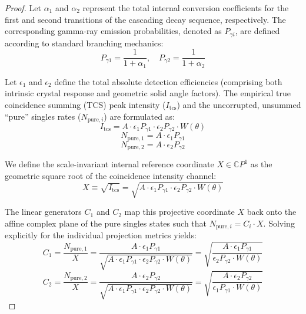 \documentclass[review]{elsarticle} %
\begin{document}
\begin{proof}
Let $\alpha_1$ and $\alpha_2$ represent the total internal conversion coefficients for the first and second transitions of the cascading decay sequence, respectively. The corresponding gamma-ray emission probabilities, denoted as $P_{\gamma i}$, are defined according to standard branching mechanics:
\begin{equation}
    P_{\gamma 1} = \frac{1}{1+\alpha_1}, \quad P_{\gamma 2} = \frac{1}{1+\alpha_2}
\end{equation}

Let $\epsilon_1$ and $\epsilon_2$ define the total absolute detection efficiencies (comprising both intrinsic crystal response and geometric solid angle factors). The empirical true coincidence summing (TCS) peak intensity ($I_{\text{tcs}}$) and the uncorrupted, unsummed ``pure'' singles rates ($N_{\text{pure}, i}$) are formulated as:
\begin{equation}
    I_{\text{tcs}} = A \cdot \epsilon_1 P_{\gamma 1} \cdot \epsilon_2 P_{\gamma 2} \cdot W(\theta)
\end{equation}
\begin{equation}
    N_{\text{pure}, 1} = A \cdot \epsilon_1 P_{\gamma 1}
\end{equation}
\begin{equation}
    N_{\text{pure}, 2} = A \cdot \epsilon_2 P_{\gamma 2}
\end{equation}

We define the scale-invariant internal reference coordinate $X \in \mathbb{C}P^1$ as the geometric square root of the coincidence intensity channel:
\begin{equation}
    X \equiv \sqrt{I_{\text{tcs}}} = \sqrt{A \cdot \epsilon_1 P_{\gamma 1} \cdot \epsilon_2 P_{\gamma 2} \cdot W(\theta)}
\end{equation}

The linear generators $C_1$ and $C_2$ map this projective coordinate $X$ back onto the affine complex plane of the pure singles states such that $N_{\text{pure}, i} = C_i \cdot X$. Solving explicitly for the individual projection metrics yields:
\begin{equation}
    C_1 = \frac{N_{\text{pure}, 1}}{X} = \frac{A \cdot \epsilon_1 P_{\gamma 1}}{\sqrt{A \cdot \epsilon_1 P_{\gamma 1} \cdot \epsilon_2 P_{\gamma 2} \cdot W(\theta)}} = \sqrt{\frac{A \cdot \epsilon_1 P_{\gamma 1}}{\epsilon_2 P_{\gamma 2} \cdot W(\theta)}}
\end{equation}
\begin{equation}
    C_2 = \frac{N_{\text{pure}, 2}}{X} = \frac{A \cdot \epsilon_2 P_{\gamma 2}}{\sqrt{A \cdot \epsilon_1 P_{\gamma 1} \cdot \epsilon_2 P_{\gamma 2} \cdot W(\theta)}} = \sqrt{\frac{A \cdot \epsilon_2 P_{\gamma 2}}{\epsilon_1 P_{\gamma 1} \cdot W(\theta)}}
\end{equation}


\end{proof}
\end{document}
